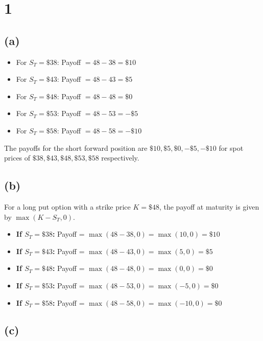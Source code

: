     \section{1}\label{section}

\subsection{(a)}\label{a}

\begin{itemize}
\tightlist
\item
  For \(S_T = \$38\): Payoff \(= 48 - 38 = \$10\)
\item
  For \(S_T = \$43\): Payoff \(= 48 - 43 = \$5\)
\item
  For \(S_T = \$48\): Payoff \(= 48 - 48 = \$0\)
\item
  For \(S_T = \$53\): Payoff \(= 48 - 53 = -\$5\)
\item
  For \(S_T = \$58\): Payoff \(= 48 - 58 = -\$10\)
\end{itemize}

The payoffs for the short forward position are
\(\boxed{\$10, \$5, \$0, -\$5, -\$10}\) for spot prices of
\(\boxed{\$38, \$43, \$48, \$53, \$58}\) respectively.

\subsection{(b)}\label{b}

For a long put option with a strike price \(K = \$48\), the payoff at
maturity is given by \(\max(K - S_T, 0)\).

\begin{itemize}
\tightlist
\item
  \textbf{If \(S_T = \$38\):} Payoff =
  \(\max(48 - 38, 0) = \max(10, 0) = \$10\)
\item
  \textbf{If \(S_T = \$43\):} Payoff =
  \(\max(48 - 43, 0) = \max(5, 0) = \$5\)
\item
  \textbf{If \(S_T = \$48\):} Payoff =
  \(\max(48 - 48, 0) = \max(0, 0) = \$0\)
\item
  \textbf{If \(S_T = \$53\):} Payoff =
  \(\max(48 - 53, 0) = \max(-5, 0) = \$0\)
\item
  \textbf{If \(S_T = \$58\):} Payoff =
  \(\max(48 - 58, 0) = \max(-10, 0) = \$0\)
\end{itemize}

\subsection{(c)}\label{c}

